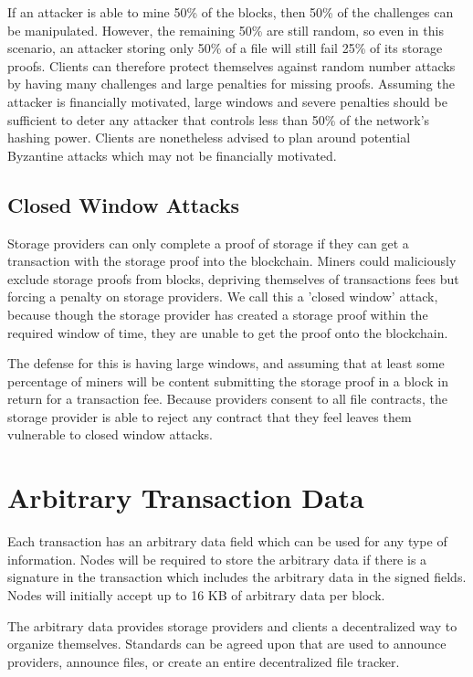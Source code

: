 \documentclass[twocolumn]{article}
\begin{document}
If an attacker is able to mine 50\% of the blocks, then 50\% of the challenges can be manipulated.
However, the remaining 50\% are still random, so even in this scenario, an attacker storing only 50\% of a file will still fail 25\% of its storage proofs.
Clients can therefore protect themselves against random number attacks by having many challenges and large penalties for missing proofs.
Assuming the attacker is financially motivated, large windows and severe penalties should be sufficient to deter any attacker that controls less than 50\% of the network's hashing power.
Clients are nonetheless advised to plan around potential Byzantine attacks which may not be financially motivated.

\subsection{Closed Window Attacks}
Storage providers can only complete a proof of storage if they can get a transaction with the storage proof into the blockchain.
Miners could maliciously exclude storage proofs from blocks, depriving themselves of transactions fees but forcing a penalty on storage providers.
We call this a 'closed window' attack, because though the storage provider has created a storage proof within the required window of time, they are unable to get the proof onto the blockchain.

The defense for this is having large windows, and assuming that at least some percentage of miners will be content submitting the storage proof in a block in return for a transaction fee.
Because providers consent to all file contracts, the storage provider is able to reject any contract that they feel leaves them vulnerable to closed window attacks.

\section{Arbitrary Transaction Data}
Each transaction has an arbitrary data field which can be used for any type of information.
Nodes will be required to store the arbitrary data if there is a signature in the transaction which includes the arbitrary data in the signed fields.
Nodes will initially accept up to 16 KB of arbitrary data per block.

The arbitrary data provides storage providers and clients a decentralized way to organize themselves.
Standards can be agreed upon that are used to announce providers, announce files, or create an entire decentralized file tracker.
\end{document}
